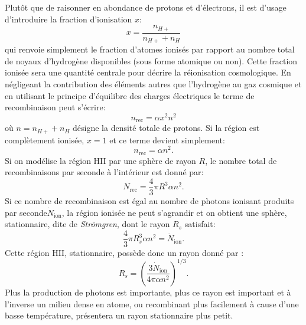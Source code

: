 Plutôt que de raisonner en abondance de protons et d'électrons, il est d'usage d'introduire la fraction d'ionisation $x$:
\begin{equation}
x=\frac{n_{H+}}{n_{H+}+n_H}
\end{equation}
qui renvoie simplement le fraction d'atomes ionisés par rapport au nombre total de noyaux d'hydrogène disponibles (sous forme atomique ou non). Cette fraction ionisée sera une quantité centrale pour décrire la réionisation cosmologique. En négligeant la contribution des éléments autres que l'hydrogène au gaz cosmique et en utilisant le principe d'équilibre des charges électriques le terme de recombinaison peut s'écrire:
\begin{equation}
n_\mathrm{rec}=\alpha x^2 n^2
\end{equation}
où $n=n_{H+}+n_H$ désigne la densité totale de protons. Si la région est complètement ionisée, $x=1$ et ce terme devient simplement:
\begin{equation}
n_\mathrm{rec}=\alpha n^2.
\end{equation}
Si on modélise la région HII par une sphère de rayon $R$, le nombre total de recombinaisons par seconde à l'intérieur est donné par:
\begin{equation}
N_\mathrm{rec}=\frac{4}{3}\pi R^3\alpha n^2.
\end{equation}
Si ce nombre de recombinaison est égal au nombre de photons ionisant produits par seconde$ \dot N_\mathrm{ion}$, la région ionisée ne peut s'agrandir et on obtient une sphère, stationnaire, dite de \textit{Strömgren}, dont le rayon $R_s$ satisfait:
\begin{equation}
\frac{4}{3}\pi R_s^3\alpha n^2=\dot N_\mathrm{ion}.
\end{equation}
Cette région HII, stationnaire, possède donc un rayon donné par :
\begin{equation}
R_s=\left(\frac{3 \dot N_\mathrm{ion}}{4\pi \alpha n^2}\right)^{1/3}.
\end{equation}
Plus la production de photons est importante, plus ce rayon est important et à l'inverse un milieu dense en atome, ou recombinant plus facilement à cause d'une basse température, présentera un rayon stationnaire plus petit.

